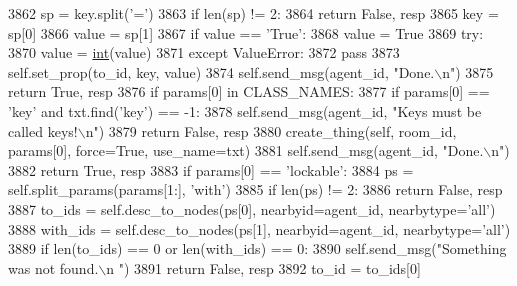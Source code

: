 \begin{DoxyCode}
3862                 sp = key.split(\textcolor{stringliteral}{'='})
3863                 \textcolor{keywordflow}{if} len(sp) != 2:
3864                     \textcolor{keywordflow}{return} \textcolor{keyword}{False}, resp
3865                 key = sp[0]
3866                 value = sp[1]
3867                 \textcolor{keywordflow}{if} value == \textcolor{stringliteral}{'True'}:
3868                     value = \textcolor{keyword}{True}
3869                 \textcolor{keywordflow}{try}:
3870                     value = \hyperlink{namespacelanguage__model_1_1eval__ppl_a7d12ee00479673c5c8d1f6d01faa272a}{int}(value)
3871                 \textcolor{keywordflow}{except} ValueError:
3872                     \textcolor{keywordflow}{pass}
3873             self.set\_prop(to\_id, key, value)
3874             self.send\_msg(agent\_id, \textcolor{stringliteral}{"Done.\(\backslash\)n"})
3875             \textcolor{keywordflow}{return} \textcolor{keyword}{True}, resp
3876         \textcolor{keywordflow}{if} params[0] \textcolor{keywordflow}{in} CLASS\_NAMES:
3877             \textcolor{keywordflow}{if} params[0] == \textcolor{stringliteral}{'key'} \textcolor{keywordflow}{and} txt.find(\textcolor{stringliteral}{'key'}) == -1:
3878                 self.send\_msg(agent\_id, \textcolor{stringliteral}{"Keys must be called keys!\(\backslash\)n"})
3879                 \textcolor{keywordflow}{return} \textcolor{keyword}{False}, resp
3880             create\_thing(self, room\_id, params[0], force=\textcolor{keyword}{True}, use\_name=txt)
3881             self.send\_msg(agent\_id, \textcolor{stringliteral}{"Done.\(\backslash\)n"})
3882             \textcolor{keywordflow}{return} \textcolor{keyword}{True}, resp
3883         \textcolor{keywordflow}{if} params[0] == \textcolor{stringliteral}{'lockable'}:
3884             ps = self.split\_params(params[1:], \textcolor{stringliteral}{'with'})
3885             \textcolor{keywordflow}{if} len(ps) != 2:
3886                 \textcolor{keywordflow}{return} \textcolor{keyword}{False}, resp
3887             to\_ids = self.desc\_to\_nodes(ps[0], nearbyid=agent\_id, nearbytype=\textcolor{stringliteral}{'all'})
3888             with\_ids = self.desc\_to\_nodes(ps[1], nearbyid=agent\_id, nearbytype=\textcolor{stringliteral}{'all'})
3889             \textcolor{keywordflow}{if} len(to\_ids) == 0 \textcolor{keywordflow}{or} len(with\_ids) == 0:
3890                 self.send\_msg(\textcolor{stringliteral}{"Something was not found.\(\backslash\)n "})
3891                 \textcolor{keywordflow}{return} \textcolor{keyword}{False}, resp
3892             to\_id = to\_ids[0]

\end{DoxyCode}
